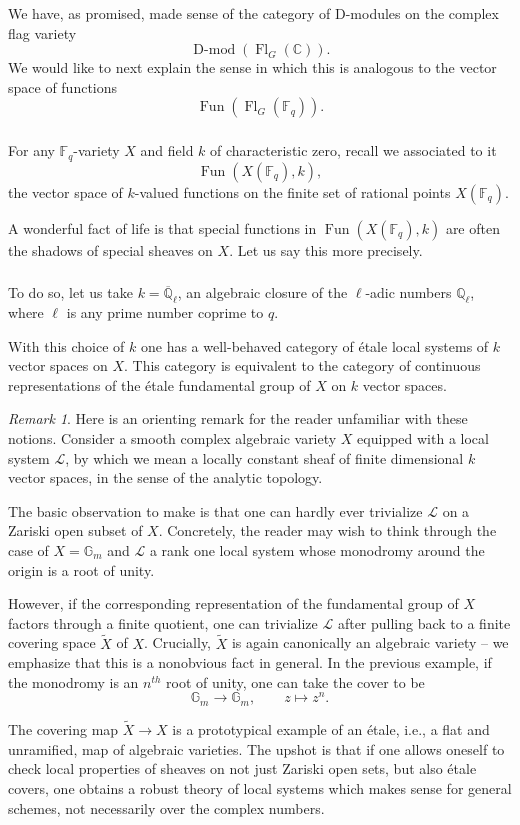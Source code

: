 \documentclass[10pt]{amsart}
\newcommand{\sB}{\on{Fl}_G}
\newcommand{\on}{\operatorname}
\newcommand{\Fq}{\mathbb{F}_q}
\newcommand{\Fun}{\on{Fun}}
\theoremstyle{remark}
\newtheorem{re}[subsubsection]{Remark}
\newcommand{\sL}{\mathscr{L}}
\newcommand{\C}{\ensuremath{\mathbb{C}}}
\numberwithin{equation}{section}
\newcommand{\Qlb}{\overline{\mathbb{Q}}_\ell}
\begin{document}
	We have, as promised, made sense of the category of D-modules on 
	the complex flag variety
	\[
	\on{D-mod}(\sB(\C)). 
	\]
We would like to next explain the sense in which this is analogous to the vector 
	space of functions $$\Fun(\sB(\Fq)).$$ 
	\subsubsection{} For any $\Fq$-variety $X$ and field $k$ of characteristic 
	zero, recall we associated to it 
	\[
	\Fun(X(\Fq), k),
	\]
	the vector space of $k$-valued functions on the finite set of rational 
	points $X(\Fq)$. 
	
	A wonderful fact of life is that special functions in $\Fun(X(\Fq), k)$ are 
	often the shadows of special sheaves on $X$. Let us say this more 
	precisely. 
	
	\subsubsection{}\label{s:ladic} To do so, let us take $k = \Qlb$, an algebraic closure of 
	the $\ell$-adic numbers $\mathbb{Q}_\ell$, where $\ell$ is any prime number coprime to $q$. 
	
	With this choice of $k$ one has a well-behaved category of \'{e}tale local 
	systems of $k$ vector spaces on $X$. This category is 
	equivalent to the category of continuous representations of the \'{e}tale 
	fundamental group of $X$ on $k$ vector spaces. 
	
	
	\begin{re} Here is an orienting remark for the reader unfamiliar with these 
	notions. Consider a smooth complex algebraic variety $X$ equipped with a 
	local system $\sL$, by which we mean a locally constant sheaf of finite dimensional $k$ vector spaces, in 
	the sense of the analytic topology.
		
		
		The basic observation to make is that one can hardly ever trivialize 
		$\sL$ on a Zariski open subset of $X$. Concretely, the reader may wish 
		to think through the case of $X = \mathbb{G}_m$ and $\sL$ a rank one 
		local system whose monodromy around the origin is a root of unity.
		
		However, if the corresponding representation of the fundamental group 
		of $X$ factors through a finite quotient, one can trivialize $\sL$ 
		after pulling back to a finite covering space $\tilde{X}$ of $X$. 
		Crucially, $\tilde{X}$ is again canonically an algebraic variety -- we 
		emphasize that this is a nonobvious fact in general. In the previous 
		example, if the monodromy is an $n^{th}$ root of unity, one can take 
		the cover to be 
		\[
		\mathbb{G}_m \rightarrow \mathbb{G}_m, \quad \quad z \mapsto z^n. 
		\]
		
		The covering map $\tilde{X} \rightarrow X$ is a prototypical example of 
		an \'{e}tale, i.e., a flat and unramified, map of algebraic varieties. The 
		upshot is that if one allows oneself to check local properties of 
		sheaves on not just Zariski open sets, but also \'{e}tale covers, one 
		obtains a robust theory of local systems which makes sense for general 
		schemes, not necessarily over the complex numbers. \end{re}
	
\end{document}
